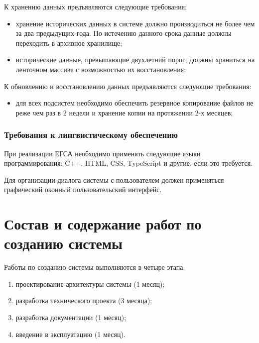 \documentclass[a4paper, 14pt]{extarticle}
\begin{document}
К хранению данных предъявляются следующие требования:
\begin{itemize}
  \item хранение исторических данных в системе должно производиться не более чем
  за два предыдущих года. По истечению данного срока данные должны переходить в
  архивное хранилище;
  \item исторические данные, превышающие двухлетний порог, должны храниться на
  ленточном массиве с возможностью их восстановления;
\end{itemize}

К обновлению и восстановлению данных предъявляются следующие требования:
\begin{itemize}
  \item для всех подсистем необходимо обеспечить резервное копирование файлов не
  реже чем раз в 2 недели и хранение копии на протяжении 2-х месяцев;
\end{itemize}

\subsubsection{Требования к лингвистическому обеспечению}

При реализации ЕГСА необходимо применять следующие языки программирования: C++,
HTML, CSS, TypeScript и другие, если это требуется.

Для организации диалога системы с пользователем должен применяться графический
оконный пользовательский интерфейс.

\section{Состав и содержание работ по созданию системы}

Работы по созданию системы выполняются в четыре этапа:
\begin{enumerate}
  \item проектирование архитектуры системы (1 месяц);
  \item разработка технического проекта (3 месяца);
  \item разработка документации (1 месяц);
  \item введение в эксплуатацию (1 месяц).
\end{enumerate}
\end{document}

